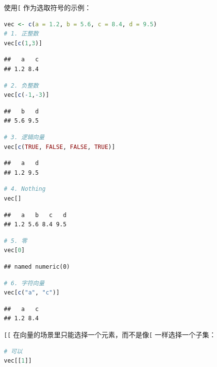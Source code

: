 \documentclass[]{ctexbook}
\newcommand{\passthrough}[1]{#1}
\begin{document}
使用\passthrough{\lstinline![!} 作为选取符号的示例：

\begin{lstlisting}[language=R]
vec <- c(a = 1.2, b = 5.6, c = 8.4, d = 9.5)
# 1. 正整数
vec[c(1,3)]
\end{lstlisting}

\begin{lstlisting}
##   a   c 
## 1.2 8.4
\end{lstlisting}

\begin{lstlisting}[language=R]
# 2. 负整数
vec[c(-1,-3)]
\end{lstlisting}

\begin{lstlisting}
##   b   d 
## 5.6 9.5
\end{lstlisting}

\begin{lstlisting}[language=R]
# 3. 逻辑向量
vec[c(TRUE, FALSE, FALSE, TRUE)]
\end{lstlisting}

\begin{lstlisting}
##   a   d 
## 1.2 9.5
\end{lstlisting}

\begin{lstlisting}[language=R]
# 4. Nothing
vec[]
\end{lstlisting}

\begin{lstlisting}
##   a   b   c   d 
## 1.2 5.6 8.4 9.5
\end{lstlisting}

\begin{lstlisting}[language=R]
# 5. 零
vec[0]
\end{lstlisting}

\begin{lstlisting}
## named numeric(0)
\end{lstlisting}

\begin{lstlisting}[language=R]
# 6. 字符向量
vec[c("a", "c")]
\end{lstlisting}

\begin{lstlisting}
##   a   c 
## 1.2 8.4
\end{lstlisting}

\passthrough{\lstinline![[!} 在向量的场景里只能选择一个元素，而不是像\passthrough{\lstinline![!} 一样选择一个子集：

\begin{lstlisting}[language=R]
# 可以
vec[[1]]
\end{lstlisting}
\end{document}
